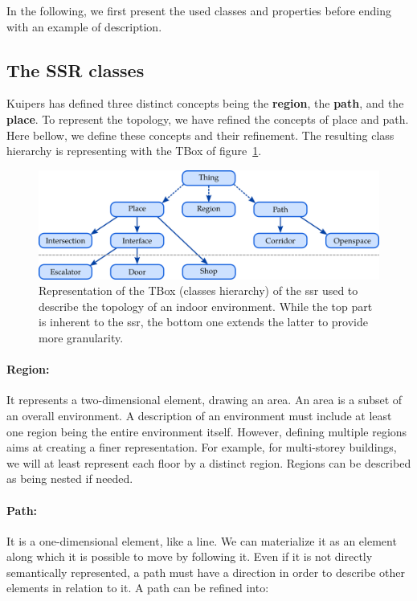 In the following, we first present the used classes and properties before ending with an example of description.

\subsection{The SSR classes}

Kuipers has defined three distinct concepts being the \textbf{region}, the \textbf{path}, and the \textbf{place}. To represent the topology, we have refined the concepts of place and path. Here bellow, we define these concepts and their refinement. The resulting class hierarchy is representing with the TBox of figure~\ref{fig:chap3_tbox}.

\begin{figure}[ht!]
\centering
\includegraphics[scale=0.4]{figures/chapter3/ssr_tbox.png}
\caption{\label{fig:chap3_tbox} Representation of the TBox (classes hierarchy) of the \acrlong{ssr} used to describe the topology of an indoor environment. While the top part is inherent to the \acrshort{ssr}, the bottom one extends the latter to provide more granularity.}
\end{figure}

\paragraph{Region:} It represents a two-dimensional element, drawing an area. An area is a subset of an overall environment. A description of an environment must include at least one region being the entire environment itself. However, defining multiple regions aims at creating a finer representation. For example, for multi-storey buildings, we will at least represent each floor by a distinct region. Regions can be described as being nested if needed.

\paragraph{Path:} It is a one-dimensional element, like a line. We can materialize it as an element along which it is possible to move by following it. Even if it is not directly semantically represented, a path must have a direction in order to describe other elements in relation to it. A path can be refined into:

